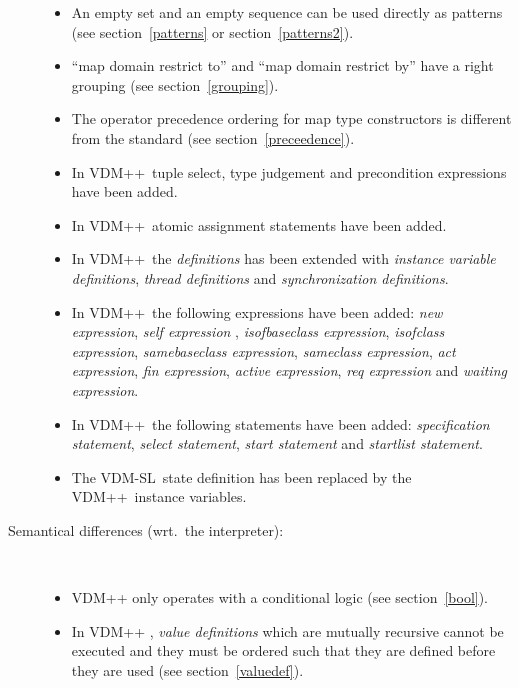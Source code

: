 \documentclass[\pformat,12pt]{article}
\newcommand{\vdmslpp}[2]{%
#2
}
\newcommand{\vdmsl}{VDM-SL}
\newcommand{\vdmpp}{VDM++}
\begin{document}
\begin{description}
\begin{itemize}
  \item An empty set and an empty sequence can be used directly as
        patterns (see section~\ref{patterns} or section~\ref{patterns2}).
  \item ``map domain restrict to'' and ``map domain restrict by'' have
        a right grouping (see section~\ref{grouping}).
  \item The operator precedence ordering for map type constructors is
        different from the standard (see section~\ref{preceedence}).
  \item In  \vdmpp\ tuple select, type judgement and
        precondition expressions have been added.
  \item In  \vdmpp\ atomic assignment statements have been added. 
  \item In  \vdmpp\ the {\em definitions} has been extended with
    {\em instance variable definitions}, 
   {\em thread definitions} and {\em synchronization
    definitions}.

  \item In  \vdmpp\ the following expressions have been added:
    {\em new expression}, {\em self expression }, {\em isofbaseclass
    expression}, {\em 
    isofclass expression}, {\em samebaseclass expression}, {\em
    sameclass expression}, {\em act expression}, {\em fin expression},
    {\em active expression}, {\em req expression} and {\em waiting
    expression}.

  \item In  \vdmpp\ the following statements have been added: {\em
    specification statement}, {\em select statement}, {\em start
    statement} and {\em startlist statement}. %

  \item The \vdmsl\ state definition has been replaced by the \vdmpp\
    instance variables.


  \end{itemize}
  
\item[Semantical differences (wrt.\ the interpreter):]\mbox{}\\[-3mm] 
  \begin{itemize}
  
  \item  \vdmslpp{\vdmsl}{\vdmpp} only operates with a
    conditional logic (see section~\ref{bool}).
    

  \item In  \vdmslpp{\vdmsl}{\vdmpp}, {\it value definitions\/}
    which are mutually recursive cannot be executed and they must be
    ordered such that they are defined before they are used (see
    section~\ref{valuedef}).
    

\end{itemize}
\end{description}
\end{document}
